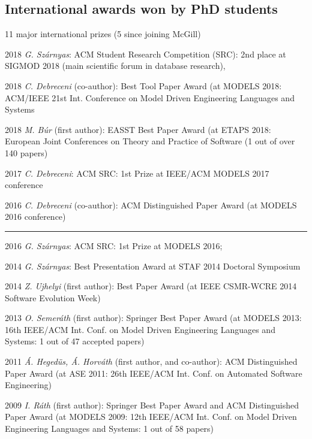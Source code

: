 \subsection{International awards won by PhD students}

11 major international prizes (5 since joining McGill) 
\begin{yearlist}
\item[2018] \emph{G. Sz\'arnyas}: ACM Student Research Competition (SRC): 2nd place at SIGMOD 2018 (main scientific forum in database research),
\item[2018] \emph{C. Debreceni} (co-author): Best Tool Paper Award (at MODELS 2018: ACM/IEEE 21st Int. Conference on Model Driven Engineering Languages and Systems
\item[2018] \emph{M. B\'ur} (first author): EASST Best Paper Award (at ETAPS 2018: European Joint Conferences on Theory and Practice of Software (1 out of over 140 papers)
\item[2017] \emph{C. Debreceni}: ACM SRC: 1st Prize at IEEE/ACM MODELS 2017 conference %
\item[2016] \emph{C. Debreceni} (co-author): ACM Distinguished Paper Award (at MODELS 2016 conference) 
\newline
\rule{\linewidth}{0.2mm}
\item[2016] \emph{G. Sz\'arnyas}: ACM SRC: 1st Prize at MODELS 2016; 
\item[2014] \emph{G. Sz\'arnyas}: Best Presentation Award at STAF 2014 Doctoral Symposium
\item[2014] \emph{Z. Ujhelyi} (first author): Best Paper Award (at IEEE CSMR-WCRE 2014 Software Evolution Week) 
\item[2013] \emph{O. Semer\'ath} (first author): Springer Best Paper Award (at MODELS 2013: 16th IEEE/ACM Int. Conf. on Model Driven Engineering Languages and Systems: 1 out of 47 accepted papers) 
\item[2011] \emph{\'A. Heged\"us, \'A. Horv\'ath} (first author, and co-author): ACM Distinguished Paper Award (at ASE 2011: 26th IEEE/ACM Int. Conf. on Automated Software Engineering) 
\item[2009] \emph{I. R\'ath} (first author): Springer Best Paper Award and ACM Distinguished Paper Award (at MODELS 2009: 12th IEEE/ACM Int. Conf. on Model Driven Engineering Languages and Systems: 1 out of 58 papers) 

\end{yearlist}






